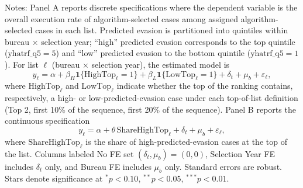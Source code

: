 \begin{table}[H]\centering
\begin{threeparttable}
\caption{Execution of algorithm-assigned audits and high predicted evasion cases at the top of the list [Full audits]}
\label{tab:exec_rate_full_panels}

\footnotesize


\begin{tablenotes}[flushleft]
\footnotesize
\item Notes: Panel A reports discrete specifications where the dependent variable is the overall execution rate of algorithm-selected cases among assigned algorithm-selected cases in each list. Predicted evasion is partitioned into quintiles within bureau $\times$ selection year; ``high'' predicted evasion corresponds to the top quintile ($\text{yhatrf\_q5}=5$) and ``low'' predicted evasion to the bottom quintile ($\text{yhatrf\_q5}=1$). For list $\ell$ (bureau $\times$ selection year), the estimated model is
\[
y_{\ell}=\alpha+\beta_H\mathbf{1}\{\text{HighTop}_{\ell}=1\}+\beta_L\mathbf{1}\{\text{LowTop}_{\ell}=1\}+\delta_t+\mu_b+\varepsilon_{\ell},
\]
where $\text{HighTop}_{\ell}$ and $\text{LowTop}_{\ell}$ indicate whether the top of the ranking contains, respectively, a high- or low-predicted-evasion case under each top-of-list definition (Top 2, first 10\% of the sequence, first 20\% of the sequence). Panel B reports the continuous specification
\[
y_{\ell}=\alpha+\theta\,\text{ShareHighTop}_{\ell}+\delta_t+\mu_b+\varepsilon_{\ell},
\]
where $\text{ShareHighTop}_{\ell}$ is the share of high-predicted-evasion cases at the top of the list. Columns labeled No FE set $(\delta_t,\mu_b)=(0,0)$, Selection Year FE includes $\delta_t$ only, and Bureau FE includes $\mu_b$ only. Standard errors are robust. Stars denote significance at $^{*}p<0.10$, $^{**}p<0.05$, $^{***}p<0.01$.
\end{tablenotes}
\end{threeparttable}
\end{table}

